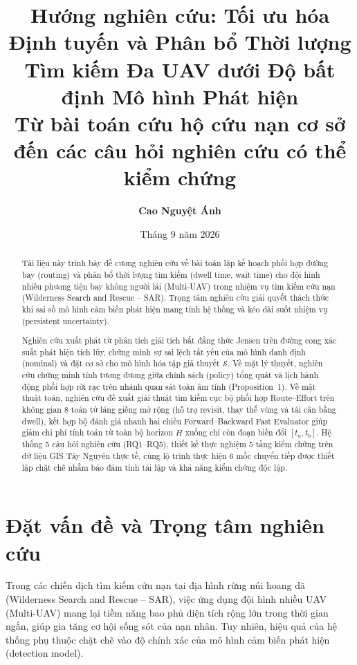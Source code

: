 \documentclass[12pt,a4paper]{article}
\title{
\textbf{Hướng nghiên cứu: Tối ưu hóa Định tuyến và Phân bổ Thời lượng Tìm kiếm Đa UAV dưới Độ bất định Mô hình Phát hiện}\\[0.5em]
\large Từ bài toán cứu hộ cứu nạn cơ sở đến các câu hỏi nghiên cứu có thể kiểm chứng
}
\author{\textbf{Cao Nguyệt Ánh}}
\date{Tháng 9 năm 2026}
\begin{document}
\maketitle

\begin{abstract}
Tài liệu này trình bày đề cương nghiên cứu về bài toán lập kế hoạch phối hợp đường bay (routing) và phân bổ thời lượng tìm kiếm (dwell time, wait time) cho đội hình nhiều phương tiện bay không người lái (Multi-UAV) trong nhiệm vụ tìm kiếm cứu nạn (Wilderness Search and Rescue -- SAR). Trọng tâm nghiên cứu giải quyết thách thức khi sai số mô hình cảm biến phát hiện mang tính hệ thống và kéo dài suốt nhiệm vụ (persistent uncertainty). 

Nghiên cứu xuất phát từ phân tích giải tích bất đẳng thức Jensen trên đường cong xác suất phát hiện tích lũy, chứng minh sự sai lệch tất yếu của mô hình danh định (nominal) và đặt cơ sở cho mô hình hóa tập giả thuyết $\mathcal{S}$. Về mặt lý thuyết, nghiên cứu chứng minh tính tương đương giữa chính sách (policy) tổng quát và lịch hành động phối hợp rời rạc trên nhánh quan sát toàn âm tính (Proposition~1). Về mặt thuật toán, nghiên cứu đề xuất giải thuật tìm kiếm cục bộ phối hợp Route--Effort trên không gian 8 toán tử láng giềng mở rộng (hỗ trợ revisit, thay thế vùng và tái cân bằng dwell), kết hợp bộ đánh giá nhanh hai chiều Forward--Backward Fast Evaluator giúp giảm chi phí tính toán từ toàn bộ horizon $H$ xuống chỉ còn đoạn biến đổi $[t_a, t_b]$. Hệ thống 5 câu hỏi nghiên cứu (RQ1--RQ5), thiết kế thực nghiệm 5 tầng kiểm chứng trên dữ liệu GIS Tây Nguyên thực tế, cùng lộ trình thực hiện 6 mốc chuyển tiếp được thiết lập chặt chẽ nhằm bảo đảm tính tái lập và khả năng kiểm chứng độc lập.
\end{abstract}

\tableofcontents
\newpage

\section{Đặt vấn đề và Trọng tâm nghiên cứu}

Trong các chiến dịch tìm kiếm cứu nạn tại địa hình rừng núi hoang dã (Wilderness Search and Rescue -- SAR), việc ứng dụng đội hình nhiều UAV (Multi-UAV) mang lại tiềm năng bao phủ diện tích rộng lớn trong thời gian ngắn, giúp gia tăng cơ hội sống sót của nạn nhân. Tuy nhiên, hiệu quả của hệ thống phụ thuộc chặt chẽ vào độ chính xác của mô hình cảm biến phát hiện (detection model).
\end{document}
